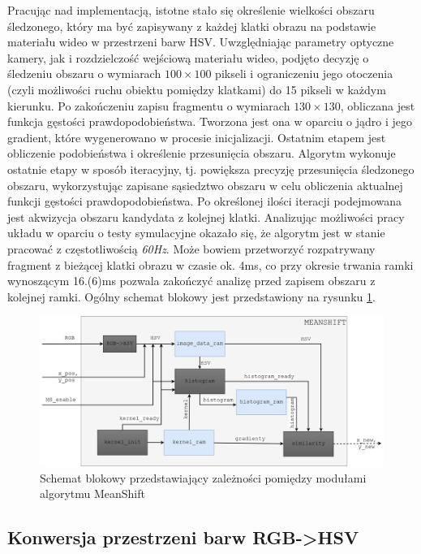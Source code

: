 Pracując nad implementacją, istotne stało się określenie wielkości obszaru śledzonego, który ma być zapisywany z każdej klatki obrazu na podstawie materiału wideo w przestrzeni barw HSV.
Uwzględniając parametry optyczne kamery, jak i rozdzielczość wejściową materiału wideo, podjęto decyzję o śledzeniu obszaru o wymiarach $100 \times 100$ pikseli i ograniczeniu jego otoczenia (czyli możliwości ruchu obiektu pomiędzy klatkami) do 15 pikseli w każdym kierunku.
Po zakończeniu zapisu fragmentu o wymiarach $130 \times 130$, obliczana jest funkcja gęstości prawdopodobieństwa. Tworzona jest ona w oparciu o jądro i jego gradient, które wygenerowano w procesie inicjalizacji. Ostatnim etapem jest obliczenie podobieństwa i określenie przesunięcia obszaru. Algorytm wykonuje ostatnie etapy w sposób iteracyjny, tj. powiększa precyzję przesunięcia śledzonego obszaru, wykorzystując zapisane sąsiedztwo obszaru w celu obliczenia aktualnej funkcji gęstości prawdopodobieństwa. Po określonej ilości iteracji podejmowana jest akwizycja obszaru kandydata z kolejnej klatki.
Analizując możliwości pracy układu w oparciu o testy symulacyjne okazało się, że algorytm jest w stanie pracować z częstotliwością \textit{60Hz}. Może bowiem przetworzyć rozpatrywany fragment z bieżącej klatki obrazu w czasie ok. 4ms, co przy okresie trwania ramki wynoszącym 16.(6)ms  pozwala zakończyć analizę przed zapisem obszaru z kolejnej ramki.  %
Ogólny schemat blokowy jest przedstawiony na rysunku \ref{fig:MS_scheme}.
\begin{figure}[h]
	\centering
	\includegraphics[width=16cm]{Meanshift.png}
	\captionsetup{justification=centering,margin=1cm}
	\caption{Schemat blokowy przedstawiający zależności pomiędzy modułami algorytmu MeanShift}
	\label{fig:MS_scheme}
\end{figure}


\subsection{Konwersja przestrzeni barw RGB->HSV}

